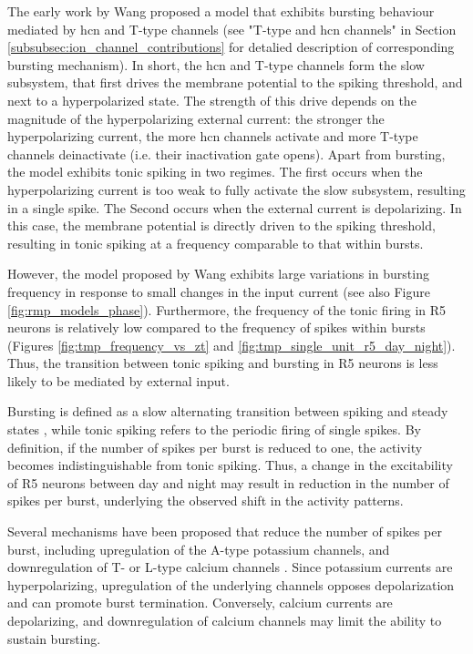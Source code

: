 \documentclass[../main.tex]{subfiles}
\begin{document}
The early work by Wang \parencite{wangMultipleDynamicalModes1994} proposed a model that exhibits bursting behaviour mediated by \gls{hcn} and T-type channels (see "T-type and \gls{hcn} channels" in Section \ref{subsubsec:ion_channel_contributions} for detalied description of corresponding bursting mechanism). In short, the \gls{hcn} and T-type channels form the slow subsystem, that first drives the membrane potential to the spiking threshold, and next to a hyperpolarized state. The strength of this drive depends on the magnitude of the hyperpolarizing external current: the stronger the hyperpolarizing current, the more \gls{hcn} channels activate and more T-type channels deinactivate (i.e. their inactivation gate opens). Apart from bursting, the model exhibits tonic spiking in two regimes. The first occurs when the hyperpolarizing current is too weak to fully activate the slow subsystem, resulting in a single spike. The Second occurs when the external current is depolarizing. In this case, the membrane potential is directly driven to the spiking threshold, resulting in tonic spiking at a frequency comparable to that within bursts.

However, the model proposed by Wang exhibits large variations in bursting frequency in response to small changes in the input current (see also Figure \ref{fig:rmp_models_phase}). Furthermore, the frequency of the tonic firing in R5 neurons is relatively low compared to the frequency of spikes within bursts (Figures \ref{fig:tmp_frequency_vs_zt} and \ref{fig:tmp_single_unit_r5_day_night}). Thus, the transition between tonic spiking and bursting in R5 neurons is less likely to be mediated by external input.

Bursting is defined as a slow alternating transition between spiking and steady states \parencite{rinzelFormalClassificationBursting1987}, while tonic spiking refers to the periodic firing of single spikes. By definition, if the number of spikes per burst is reduced to one, the activity becomes indistinguishable from tonic spiking. Thus, a change in the excitability of R5 neurons between day and night may result in reduction in the number of spikes per burst, underlying the observed shift in the activity patterns.

Several mechanisms have been proposed that reduce the number of spikes per burst, including upregulation of the A-type potassium channels, and downregulation of T- or L-type calcium channels \parencite{franciRobustTunableBursting2018,parkMathematicalModelSubthalamic2021}. Since potassium currents are hyperpolarizing, upregulation of the underlying channels opposes depolarization and can promote burst termination. Conversely, calcium currents are depolarizing, and downregulation of calcium channels may limit the ability to sustain bursting.
\end{document}
